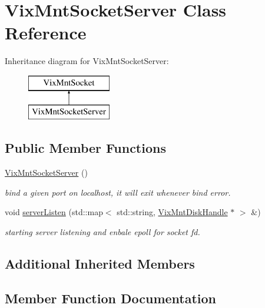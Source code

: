 \hypertarget{class_vix_mnt_socket_server}{}\section{Vix\+Mnt\+Socket\+Server Class Reference}
\label{class_vix_mnt_socket_server}
Inheritance diagram for Vix\+Mnt\+Socket\+Server\+:\begin{figure}[H]
\begin{center}
\leavevmode
\includegraphics[height=2.000000cm]{class_vix_mnt_socket_server}
\end{center}
\end{figure}
\subsection*{Public Member Functions}
\begin{DoxyCompactItemize}
\item 
\hypertarget{class_vix_mnt_socket_server_a25d7c5cf840975cec4c808f742da8b07}{}\label{class_vix_mnt_socket_server_a25d7c5cf840975cec4c808f742da8b07} 
\hyperlink{class_vix_mnt_socket_server_a25d7c5cf840975cec4c808f742da8b07}{Vix\+Mnt\+Socket\+Server} ()
\begin{DoxyCompactList}\small\item\em bind a given port on localhost, it will exit whenever bind error. \end{DoxyCompactList}\item 
void \hyperlink{class_vix_mnt_socket_server_a1f4e3f942e226f6efb071da9269a21eb}{server\+Listen} (std\+::map$<$ std\+::string, \hyperlink{class_vix_mnt_disk_handle}{Vix\+Mnt\+Disk\+Handle} $\ast$ $>$ \&)
\begin{DoxyCompactList}\small\item\em starting server listening and enbale epoll for socket fd. \end{DoxyCompactList}\end{DoxyCompactItemize}
\subsection*{Additional Inherited Members}


\subsection{Member Function Documentation}
\hypertarget{class_vix_mnt_socket_server_a1f4e3f942e226f6efb071da9269a21eb}{}\label{class_vix_mnt_socket_server_a1f4e3f942e226f6efb071da9269a21eb} 
